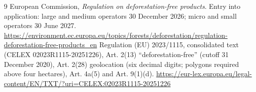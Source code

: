\documentclass[11pt]{article}
\begin{document}
\begin{thebibliography}{9}
 European Commission, \emph{Regulation on deforestation-free products}. Entry into application: large and medium operators 30 December 2026; micro and small operators 30 June 2027. \url{https://environment.ec.europa.eu/topics/forests/deforestation/regulation-deforestation-free-products_en}
 Regulation (EU) 2023/1115, consolidated text (CELEX 02023R1115-20251226), Art. 2(13) ``deforestation-free'' (cutoff 31 December 2020), Art. 2(28) geolocation (six decimal digits; polygons required above four hectares), Art. 4a(5) and Art. 9(1)(d). \url{https://eur-lex.europa.eu/legal-content/EN/TXT/?uri=CELEX:02023R1115-20251226}
\end{thebibliography}
\end{document}
